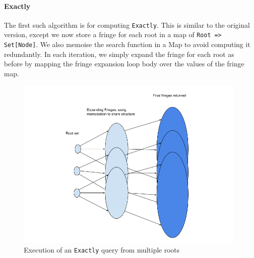 \documentclass[12pt,a4paper,twoside,openright]{report}
\newcommand\codeName[1]{\texttt{#1}}
\begin{document}
		\paragraph{Exactly}
The first such algorithm is for computing \codeName{Exactly}. This is similar to the original version, except we now store a fringe for each root in a map of \codeName{Root => Set[Node]}. We also memoise the search function in a Map to avoid computing it redundantly. In each iteration, we simply expand the fringe for each root as before by mapping the fringe expansion loop body over the values of the fringe map. 

\begin{figure}[ht]
\centering
  \includegraphics[width=\textwidth]{figs/ExactlyPairs.png}
  \caption{Execution of an \codeName{Exactly} query from multiple roots}
  \label{fig:ExactlyPairs}
\end{figure}
		
\end{document}
